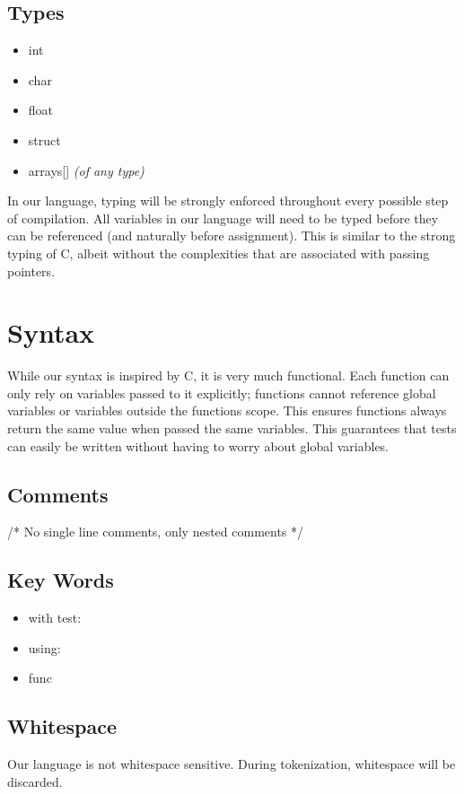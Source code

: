 \documentclass{article}
\begin{document}
\subsection{Types}
\begin{itemize}
	\item int
	\item char
	\item float
	\item struct
	\item arrays[] \textit{(of any type)}
\end{itemize}

In our language, typing will be strongly enforced throughout every possible step of compilation. All variables in our language will need to be typed before they can be referenced (and naturally before assignment). This is similar to the strong typing of C, albeit without the complexities that are associated with passing pointers.
\section{Syntax}
While our syntax is inspired by C, it is very much functional. Each function can only rely on variables passed to it explicitly; functions cannot reference global variables or variables outside the functions scope. This ensures functions always return the same value when passed the same variables. This guarantees that tests can easily be written without having to worry about global variables.

\subsection{Comments}

/* No single line comments, only nested comments */

\subsection{Key Words}
\begin{itemize}
	\item
	with test: 
	\item
	using:
	\item 
	func
\end{itemize}

\subsection{Whitespace}
Our language is not whitespace sensitive. During tokenization, whitespace will be discarded.
\end{document}
